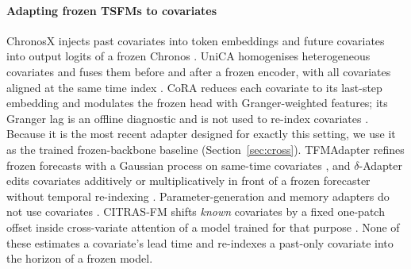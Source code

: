\documentclass[preprint,11pt,authoryear]{elsarticle}
\begin{document}
\paragraph{Adapting frozen TSFMs to covariates} ChronosX injects past covariates into token embeddings and future covariates into output logits of a frozen Chronos \citep{arango2025chronosx}. UniCA homogenises heterogeneous covariates and fuses them before and after a frozen encoder, with all covariates aligned at the same time index \citep{han2026unica}. CoRA reduces each covariate to its last-step embedding and modulates the frozen head with Granger-weighted features; its Granger lag is an offline diagnostic and is not used to re-index covariates \citep{qin2025cora}. Because it is the most recent adapter designed for exactly this setting, we use it as the trained frozen-backbone baseline (Section~\ref{sec:cross}). TFMAdapter refines frozen forecasts with a Gaussian process on same-time covariates \citep{dange2025tfmadapter}, and $\delta$-Adapter edits covariates additively or multiplicatively in front of a frozen forecaster without temporal re-indexing \citep{liang2026deltaadapter}. Parameter-generation and memory adapters do not use covariates \citep{nallagatla2026adacast,lyu2026tsmemory}. CITRAS-FM shifts \emph{known} covariates by a fixed one-patch offset inside cross-variate attention of a model trained for that purpose \citep{yamaguchi2026citrasfm,yamaguchi2026citras}. None of these estimates a covariate's lead time and re-indexes a past-only covariate into the horizon of a frozen model.
\end{document}
